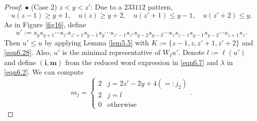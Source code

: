 \documentclass[12pt]{amsart}
\theoremstyle{definition}
\theoremstyle{remark}
\begin{document}
\begin{proof}
$\bullet$ (Case 2) $z< y < z'$: Due to a $233112$ pattern,
\begin{equation}\label{eqn6.28}
u(z-1) \geq y+1, \quad u(z) \geq y+2, \quad u(z'+1) \leq y-1, \quad u(z'+2) \leq y.
\end{equation}
As in Figure \ref{fig16}, define
\begin{equation}\label{eqn6.7}
u':=s_y s_{y+1} \cdots s_{z'} s_{z'+1} s_{y-1} s_y \cdots s_{z'-1} s_{z'} s_{y-2} s_{y-3} \cdots s_{z} s_{z-1} s_{y-1} s_{y-2} \cdots s_{z+1} s_z.
\end{equation}
Then $u' \leq u$ by applying Lemma \ref{lem5.5} with $K:=\{z-1 , z , z'+1 , z'+2 \}$ and \eqref{eqn6.28}. Also, $u'$ is the minimal representative of $W_Iu'$. Denote $l:= \ell (u')$ and define $(\mathbf{i}, \mathbf{m})$ from the reduced word expression in \eqref{eqn6.7} and $\lambda$ in \eqref{eqn6.2}. We can compute
\begin{equation}\label{eqn6.8}
m_j = 
\begin{cases}
2 & j = 2z'-2y+4 (=:j_2) \\
2 & j = l \\
0 & \text{otherwise}
\end{cases}
.
\end{equation}


\end{proof}
\end{document}
